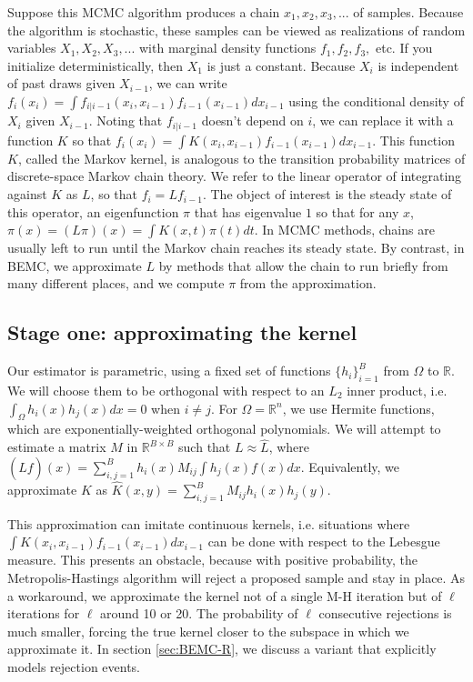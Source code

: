 \documentclass{article}
\begin{document}
Suppose this MCMC algorithm produces a chain $ x_1, x_2, x_3, ...$ of samples. Because the algorithm is stochastic, these samples can be viewed as realizations of random variables $X_1, X_2, X_3, ...$ with marginal density functions $f_1, f_2, f_3, $ etc. If you initialize deterministically, then $X_1$ is just a constant. Because $X_i$ is independent of past draws given $X_{i-1}$, we can write $f_i(x_i) = \int f_{i|i-1}(x_{i},x_{i-1})f_{i-1}(x_{i-1})dx_{i-1}$ using the conditional density of $X_i$ given $X_{i-1}$. Noting that $f_{i|i-1}$ doesn't depend on $i$, we can replace it with a function $K$ so that $f_i(x_i) = \int K(x_i, x_{i-1})f_{i-1}(x_{i-1})dx_{i-1}$. This function $K$, called the Markov kernel, is analogous to the transition probability matrices of discrete-space Markov chain theory. We refer to the linear operator of integrating against $K$ as $L$, so that $f_{i} = Lf_{i-1}$. The object of interest is the steady state of this operator, an eigenfunction $\pi$ that has eigenvalue $1$ so that for any $x$, $\pi(x) = (L\pi)(x) = \int K(x, t)\pi(t)dt$. In MCMC methods, chains are usually left to run until the Markov chain reaches its steady state. By contrast, in BEMC, we approximate $L$ by methods that allow the chain to run briefly from many different places, and we compute $\pi$ from the approximation. 

\subsection{Stage one: approximating the kernel}
\label{sec:BEMC}
Our estimator is parametric, using a fixed set of functions $\{h_i\}_{i=1}^B$ from $\Omega$ to $\mathbb{R}$. We will choose them to be orthogonal with respect to an $L_2$ inner product, i.e. $\int_{\Omega} h_i(x)h_j(x)dx = 0$ when $i \neq j$. For $\Omega=\mathbb{R}^n$, we use Hermite functions, which are exponentially-weighted orthogonal polynomials. We will attempt to estimate a matrix $M$ in $\mathbb{R}^{B\times B}$ such that $L \approx \hat{L}$, where $(\hat{L}f)(x) =\sum_{i,j=1}^B h_i(x)M_{ij}\int h_j(x)f(x)dx$. Equivalently, we approximate $K$ as $\hat{K}(x,y) = \sum_{i,j=1}^B M_{ij} h_i(x)h_j(y)$. 

This approximation can imitate continuous kernels, i.e. situations where $\int K(x_i, x_{i-1})f_{i-1}(x_{i-1})dx_{i-1}$ can be done with respect to the Lebesgue measure. This presents an obstacle, because with positive probability, the Metropolis-Hastings algorithm will reject a proposed sample and stay in place. As a workaround, we approximate the kernel not of a single M-H iteration but of $\ell$ iterations for $\ell$ around 10 or 20. The probability of $\ell$ consecutive rejections is much smaller, forcing the true kernel closer to the subspace in which we approximate it. In section \ref{sec:BEMC-R}, we discuss a variant that explicitly models rejection events.
\end{document}
